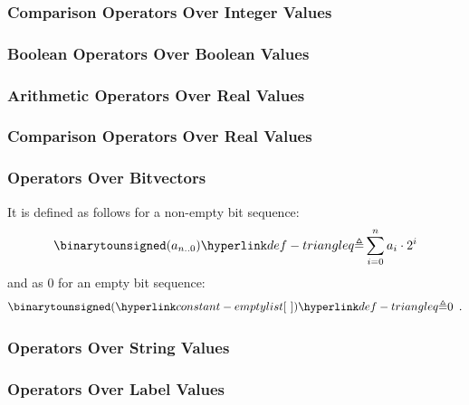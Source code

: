 \subsubsection{Comparison Operators Over Integer Values \label{sec:ComparisonOverInt}}

\subsubsection{Boolean Operators Over Boolean Values \label{sec:BooleanOverBoolean}}

\subsubsection{Arithmetic Operators Over Real Values \label{sec:AthimeticOverReal}}

\subsubsection{Comparison Operators Over Real Values \label{sec:ComparisonOverReal}}

\subsubsection{Operators Over Bitvectors \label{sec:BitvectorOperations}}

It is defined as follows for a non-empty bit sequence:
\[
  \binarytounsigned(a_{n..0}) \triangleq \sum_{i=0}^n a_i \cdot 2^{i}
\]
and as $0$ for an empty bit sequence:
\[
  \binarytounsigned(\emptylist) \triangleq 0 \enspace.
\]


\subsubsection{Operators Over String Values \label{sec:StringOperations}}

\subsubsection{Operators Over Label Values \label{sec:LabelOperations}}

